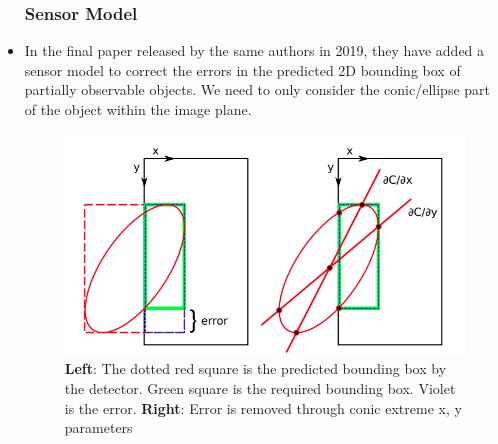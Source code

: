 \documentclass[report.tex]{subfiles}
\begin{document}
\begin{itemize}
\subsubsection{Sensor Model}


    \item In the final paper released by the same authors in 2019\cite{quadric2}, they have added a sensor model to correct the errors in the predicted 2D bounding box of partially observable objects. We need to only consider the conic/ellipse part of the object within the image plane. 
    
    \begin{figure}[H]
    \centering
    \includegraphics[width=\textwidth, height=0.3\textheight] {Images/bbox_error.png}
    \caption{\centering\textbf{Left}: The dotted red square is the predicted bounding box by the detector. Green square is the required bounding box. Violet is the error. \textbf{Right}: Error is removed through conic extreme x, y parameters\cite{quadric2}}
    \label{fig:bbox_error}
\end{figure}


\end{itemize}
\end{document}
